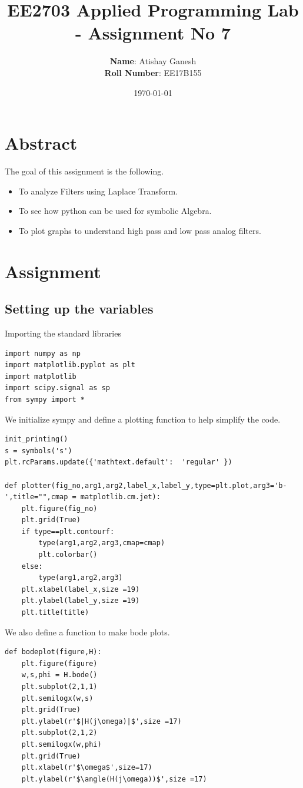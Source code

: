 \documentclass[11pt, a4paper]{article}
\title{EE2703 Applied Programming Lab - Assignment No 7}
\author{
  \textbf{Name}: Atishay Ganesh\\
  \textbf{Roll Number}: EE17B155
}\date{\today}
\begin{document}
		
\maketitle 
\section{Abstract}
The goal of this assignment is the following.
\begin{itemize}
\item To analyze Filters using Laplace Transform.
\item To see how python can be used for symbolic Algebra.
\item To plot graphs to understand high pass and low pass analog filters.
\end{itemize}

\section{Assignment}
\subsection{Setting up the variables}
Importing the standard libraries
\begin{verbatim}
import numpy as np
import matplotlib.pyplot as plt
import matplotlib
import scipy.signal as sp
from sympy import *
\end{verbatim}
We initialize sympy and define a plotting function to help simplify the code.
\begin{verbatim}
init_printing()
s = symbols('s')
plt.rcParams.update({'mathtext.default':  'regular' })

def plotter(fig_no,arg1,arg2,label_x,label_y,type=plt.plot,arg3='b-',title="",cmap = matplotlib.cm.jet):
    plt.figure(fig_no)
    plt.grid(True)
    if type==plt.contourf:
        type(arg1,arg2,arg3,cmap=cmap)
        plt.colorbar()
    else:
        type(arg1,arg2,arg3)
    plt.xlabel(label_x,size =19)
    plt.ylabel(label_y,size =19)
    plt.title(title)

\end{verbatim}

We also define a function to make bode plots.
\begin{verbatim}
def bodeplot(figure,H):
    plt.figure(figure)
    w,s,phi = H.bode()
    plt.subplot(2,1,1)
    plt.semilogx(w,s)
    plt.grid(True)
    plt.ylabel(r'$|H(j\omega)|$',size =17)
    plt.subplot(2,1,2)
    plt.semilogx(w,phi)
    plt.grid(True)
    plt.xlabel(r'$\omega$',size=17)
    plt.ylabel(r'$\angle(H(j\omega))$',size =17)

\end{verbatim}
\end{document}
